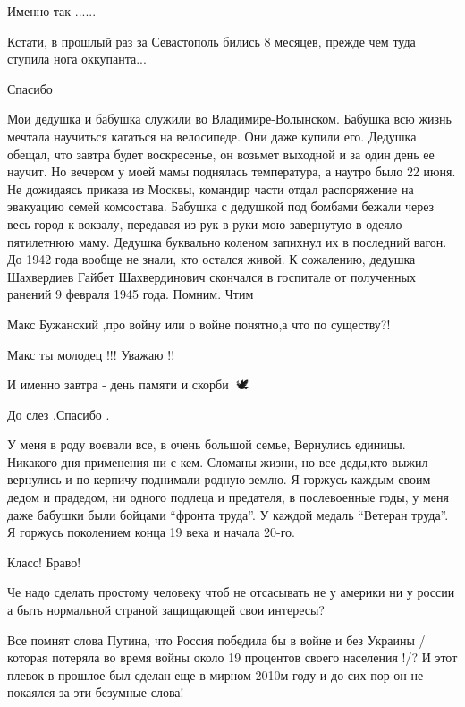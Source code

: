 \begin{itemize}
Именно так ......

Кстати, в прошлый раз за Севастополь бились 8 месяцев, прежде чем туда ступила нога оккупанта...

Спасибо


Мои дедушка и бабушка служили во Владимире-Волынском. Бабушка всю жизнь мечтала
научиться кататься на велосипеде. Они даже купили его. Дедушка обещал, что
завтра будет воскресенье, он возьмет выходной и за один день ее научит. Но
вечером у моей мамы поднялась температура, а наутро было 22 июня. Не дожидаясь
приказа из Москвы, командир части отдал распоряжение на эвакуацию семей
комсостава. Бабушка с дедушкой под бомбами бежали через весь город к вокзалу,
передавая из рук в руки мою завернутую в одеяло пятилетнюю маму. Дедушка
буквально коленом запихнул их в последний вагон. До 1942 года вообще не знали,
кто остался живой. К сожалению, дедушка Шахвердиев Гайбет Шахвердинович
скончался в госпитале от полученных ранений 9 февраля 1945 года. Помним. Чтим

Макс Бужанский ,про войну или о войне понятно,а что по существу?!

Макс ты молодец !!! Уважаю !!

И именно завтра - день памяти и скорби 🙏🕊️

До слез .Спасибо .


У меня в роду воевали все, в очень большой семье, Вернулись единицы. Никакого
дня применения ни с кем. Сломаны жизни, но все деды,кто выжил вернулись и по
керпичу поднимали родную землю. Я горжусь каждым своим дедом и прадедом, ни
одного подлеца и предателя, в послевоенные годы, у меня даже бабушки были
бойцами \enquote{фронта труда}. У каждой медаль \enquote{Ветеран труда}. Я
горжусь поколением конца 19 века и начала 20-го.


Класс! Браво!


Че надо сделать простому человеку чтоб не отсасывать не у америки ни у россии а быть нормальной страной защищающей свои интересы?


Все помнят слова Путина, что Россия победила бы в войне и без Украины /которая
потеряла во время войны около 19 процентов своего населения !/? И этот плевок в
прошлое был сделан еще в мирном 2010м году и до сих пор он не покаялся за эти
безумные слова!


\end{itemize}
